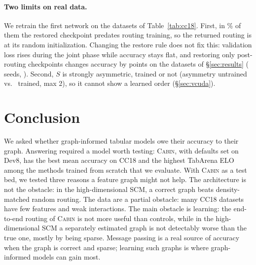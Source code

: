\documentclass[anon,12pt]{clear2027} %
\newcommand{\Cabin}{\textsc{Cabin}}
\begin{document}
\paragraph{Two limits on real data.}
We retrain the first network on the \DagN{} datasets of Table~\ref{tab:cc18}. First, in \DagBaseUntrained{}\% of them the restored checkpoint predates routing training, so the returned routing is at its random initialization. Changing the restore rule does not fix this: validation loss rises during the joint phase while accuracy stays flat, and restoring only post-routing checkpoints changes accuracy by \SensFixSeedsDelta{} points on the \SensTasks{} datasets of \S\ref{sec:results} (\SensFixSeedsN{} seeds, \SensFixSeedsPe{}). Second, $S$ is strongly asymmetric, trained or not (asymmetry \DagAsymUntrained{} untrained vs.\ \DagAsymTrained{} trained, max 2), so it cannot show a learned order (\S\ref{sec:vcuda}).

\section{Conclusion}
\label{sec:conclusion}

We asked whether graph-informed tabular models owe their accuracy to their graph. Answering required a model worth testing: \Cabin{}, with defaults set on Dev8, has the best mean accuracy on CC18 and the highest TabArena ELO among the methods trained from scratch that we evaluate. With \Cabin{} as a test bed, we tested three reasons a feature graph might not help. The architecture is not the obstacle: in the high-dimensional SCM, a correct graph beats density-matched random routing. The data are a partial obstacle: many CC18 datasets have few features and weak interactions. The main obstacle is learning: the end-to-end routing of \Cabin{} is not more useful than controls, while in the high-dimensional SCM a separately estimated graph is not detectably worse than the true one, mostly by being sparse. Message passing is a real source of accuracy when the graph is correct and sparse; learning such graphs is where graph-informed models can gain most.
\end{document}
